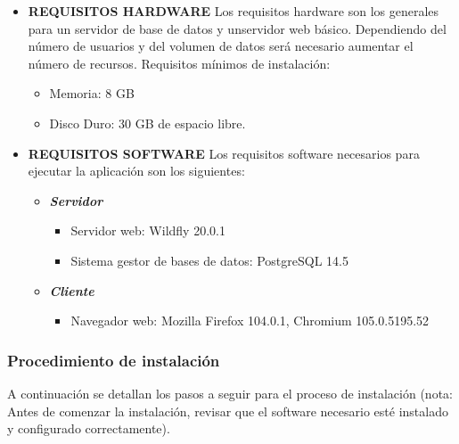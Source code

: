 \begin{itemize}
\item \textbf{REQUISITOS HARDWARE}\newline
Los requisitos hardware son los generales para un servidor de base de datos y unservidor web básico. Dependiendo del número de usuarios y del volumen de datos será necesario aumentar el número de recursos.
Requisitos mínimos de instalación:
	\begin{itemize}
	\item Memoria: 8 GB
	\item Disco Duro: 30 GB de espacio libre.
	\end{itemize} 

\item \textbf{REQUISITOS SOFTWARE}\newline
Los requisitos software necesarios para ejecutar la aplicación son los siguientes:
	\begin{itemize}
		\item \textit{\textbf{Servidor}}
		\begin{itemize}
			\item Servidor web: Wildfly 20.0.1
			\item Sistema gestor de bases de datos: PostgreSQL 14.5
		\end{itemize}

		\item \textit{\textbf{Cliente}}
		\begin{itemize}
			\item Navegador web: Mozilla Firefox 104.0.1, Chromium 105.0.5195.52
		\end{itemize}
	\end{itemize}
\end{itemize}




\subsubsection{Procedimiento de instalación}
\label{sub:proceso-instalacion}
A continuación se detallan los pasos a seguir para el proceso de instalación (nota: Antes de comenzar la instalación, revisar que el software necesario esté instalado y configurado correctamente).

